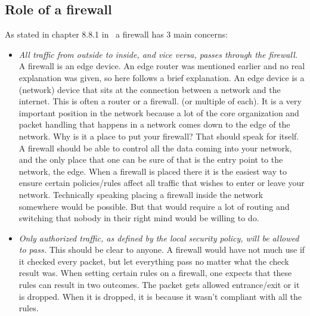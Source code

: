 \subsection{Role of a firewall}
As stated in chapter 8.8.1 in ~\textcite{NetworkingPearson}a firewall has 3 main concerns:
\begin{itemize}
\item\textit{ All traffic from outside to inside, and vice versa, passes through the firewall.} A firewall is an edge device. An edge router was mentioned earlier and no real explanation was given, so here follows a brief explanation. An edge device is a (network) device that sits at the connection between a network and the internet. This is often a router or a firewall. (or multiple of each). It is a very important position in the network because a lot of the core organization and packet handling that happens in a network comes down to the edge of the network. Why is it a place to put your firewall? That should speak for itself. A firewall should be able to control all the data coming into your network, and the only place that one can be sure of that is the entry point to the network, the edge. When a firewall is placed there it is the easiest way to ensure certain policies/rules affect all traffic that wishes to enter or leave your network. Technically speaking placing a firewall inside the network somewhere would be possible. But that would require a lot of routing and switching that nobody in their right mind would be willing to do.
\item \textit{Only authorized traffic, as defined by the local security policy, will be allowed to pass.} This should be clear to anyone. A firewall would have not much use if it checked every packet, but let everything pass no matter what the check result was. When setting certain rules on a firewall, one expects that these rules can result in two outcomes. The packet gets allowed entrance/exit or it is dropped. When it is dropped, it is because it wasn't compliant with all the rules.

\end{itemize}
